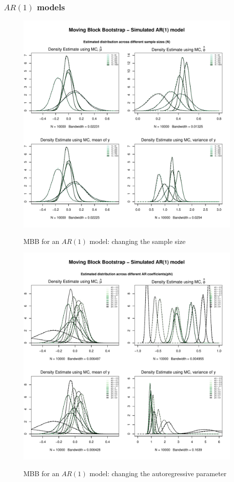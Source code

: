\documentclass{article}
\begin{document}
\subsubsection{$AR(1)$ models}
\begin{figure}[hbt!]
\includegraphics[width=\textwidth]{plots/MBB_AR1_densities_diff_smpl}
\label{fig:MBB_AR1_densities_diff_smpl}
\caption{MBB for an $AR(1)$ model: changing the sample size}
\centering
\end{figure}

\begin{figure}[hbt!]
\includegraphics[width=\textwidth]{plots/MBB_AR1_densities_diff_ARq}
\label{fig:MBB_AR1_densities_diff_ARq}
\caption{MBB for an $AR(1)$ model: changing the autoregressive parameter}
\centering
\end{figure}
\end{document}
